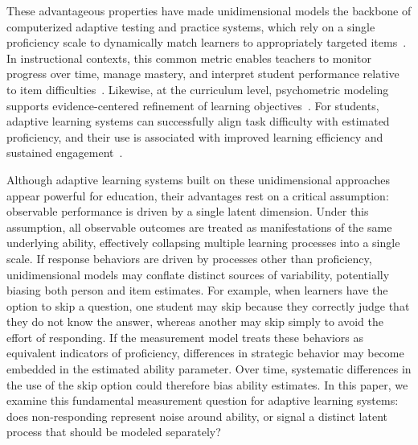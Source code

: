 \documentclass[12pt]{article}
\begin{document}
These advantageous properties have made unidimensional models the backbone of computerized adaptive testing and practice systems, which rely on a single proficiency scale to dynamically match learners to appropriately targeted items~\parencite{weiss1982improving, van2010elements, magis2017computerized}. In instructional contexts, this common metric enables teachers to monitor progress over time, manage mastery, and interpret student performance relative to item difficulties~\parencite{corbett1995knowledge, maris2012speed, deonovic2018learning, saric-grgic2024twenty-five}. Likewise, at the curriculum level, psychometric modeling supports evidence-centered refinement of learning objectives~\parencite{mislevy1996missing, glaser2001knowing}. For students, adaptive learning systems can successfully align task difficulty with estimated proficiency, and their use is associated with improved learning efficiency and sustained engagement~\parencite{eggen2006optimal, ma2014intelligent, van2010elements}. 

Although adaptive learning systems built on these unidimensional approaches appear powerful for education, their advantages rest on a critical assumption: observable performance is driven by a single latent dimension. Under this assumption, all observable outcomes are treated as manifestations of the same underlying ability, effectively collapsing multiple learning processes into a single scale. If response behaviors are driven by processes other than proficiency, unidimensional models may conflate distinct sources of variability, potentially biasing both person and item estimates. For example, when learners have the option to skip a question, one student may skip because they correctly judge that they do not know the answer, whereas another may skip simply to avoid the effort of responding. If the measurement model treats these behaviors as equivalent indicators of proficiency, differences in strategic behavior may become embedded in the estimated ability parameter. Over time, systematic differences in the use of the skip option could therefore bias ability estimates. In this paper, we examine this fundamental measurement question for adaptive learning systems: does non-responding represent noise around ability, or signal a distinct latent process that should be modeled separately? 
\end{document}

